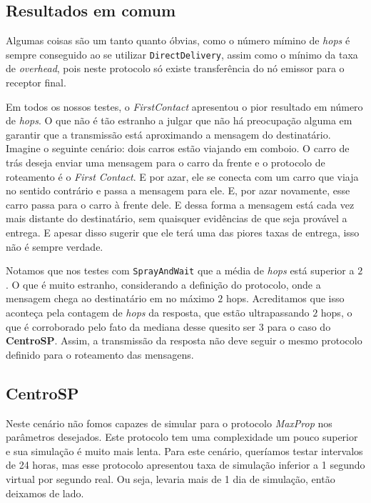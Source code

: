 \documentclass[conference]{IEEEtran}
\begin{document}
\subsection{Resultados em comum}
\label{sec:resultados:comum}
Algumas coisas são um tanto quanto óbvias, como o número mímino de \textit{hops} é sempre conseguido ao se utilizar \texttt{DirectDelivery}, assim como o mínimo da taxa de \textit{overhead}, pois neste protocolo só existe transferência do nó emissor para o receptor final.

Em todos os nossos testes, o \textit{FirstContact} apresentou o pior resultado em número de \textit{hops}. O que não é tão estranho a julgar que não há preocupação alguma em garantir que a transmissão está aproximando a mensagem do destinatário. Imagine o seguinte cenário: dois carros estão viajando em comboio. O carro de trás deseja enviar uma mensagem para o carro da frente e o protocolo de roteamento é o \textit{First Contact}. E por azar, ele se conecta com um carro que viaja no sentido contrário e passa a mensagem para ele. E, por azar novamente, esse carro passa para o carro à frente dele. E dessa forma a mensagem está cada vez mais distante do destinatário, sem quaisquer evidências de que seja provável a entrega. E apesar disso sugerir que ele terá uma das piores taxas de entrega, isso não é sempre verdade.

Notamos que nos testes com \texttt{SprayAndWait} que a média de \textit{hops} está superior a $2$. O que é muito estranho, considerando a definição do protocolo, onde a mensagem chega ao destinatário em no máximo $2$ hops. Acreditamos que isso aconteça pela contagem de \textit{hops} da resposta, que estão ultrapassando $2$ hops, o que é corroborado pelo fato da mediana desse quesito ser $3$ para o caso do \textbf{CentroSP}. Assim, a transmissão da resposta não deve seguir o mesmo protocolo definido para o roteamento das mensagens.

\subsection{CentroSP}
Neste cenário não fomos capazes de simular para o protocolo \emph{MaxProp} nos parâmetros desejados. Este protocolo tem uma complexidade um pouco superior e sua simulação é muito mais lenta. Para este cenário, queríamos testar intervalos de 24 horas, mas esse protocolo apresentou taxa de simulação inferior a 1 segundo virtual por segundo real. Ou seja, levaria mais de 1 dia de simulação, então deixamos de lado.
\end{document}
